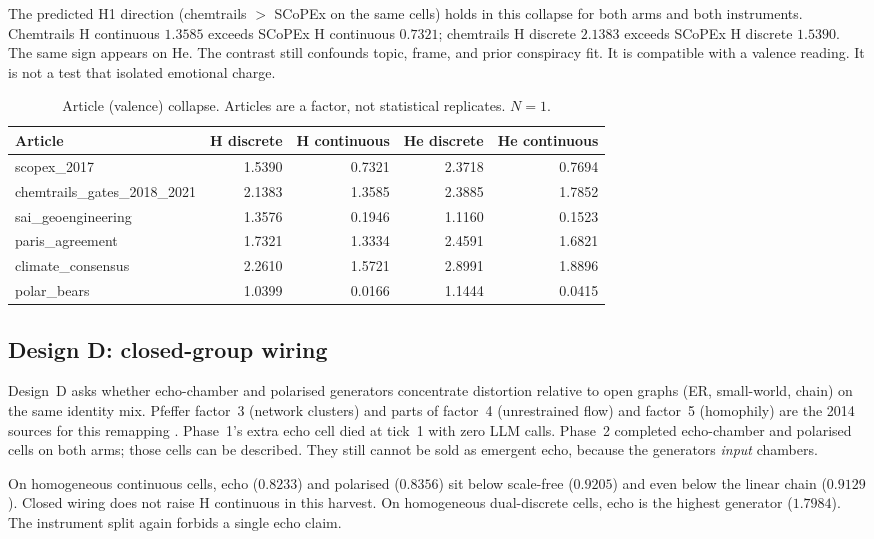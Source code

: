 The predicted H1 direction (chemtrails $>$ SCoPEx on the same cells) holds in this collapse for both arms and both instruments.
Chemtrails H continuous $1.3585$ exceeds SCoPEx H continuous $0.7321$; chemtrails H discrete $2.1383$ exceeds SCoPEx H discrete $1.5390$.
The same sign appears on He.
The contrast still confounds topic, frame, and prior conspiracy fit.
It is compatible with a valence reading.
It is not a test that isolated emotional charge.

\begin{table}[t]
\centering
\caption{Article (valence) collapse.
Articles are a factor, not statistical replicates.
$N=1$.}
\label{tab:articles}
\begin{tabular}{lrrrr}
\toprule
Article & H discrete & H continuous & He discrete & He continuous \\
\midrule
scopex\_2017 & 1.5390 & 0.7321 & 2.3718 & 0.7694 \\
chemtrails\_gates\_2018\_2021 & 2.1383 & 1.3585 & 2.3885 & 1.7852 \\
sai\_geoengineering & 1.3576 & 0.1946 & 1.1160 & 0.1523 \\
paris\_agreement & 1.7321 & 1.3334 & 2.4591 & 1.6821 \\
climate\_consensus & 2.2610 & 1.5721 & 2.8991 & 1.8896 \\
polar\_bears & 1.0399 & 0.0166 & 1.1444 & 0.0415 \\
\bottomrule
\end{tabular}
\end{table}

\subsection{Design D: closed-group wiring}

Design~D asks whether echo-chamber and polarised generators concentrate distortion relative to open graphs (ER, small-world, chain) on the same identity mix.
Pfeffer factor~3 (network clusters) and parts of factor~4 (unrestrained flow) and factor~5 (homophily) are the 2014 sources for this remapping \parencite{pfeffer2014firestorms}.
Phase~1's extra echo cell died at tick~1 with zero LLM calls.
Phase~2 completed echo-chamber and polarised cells on both arms; those cells can be described.
They still cannot be sold as emergent echo, because the generators \emph{input} chambers.

On homogeneous continuous cells, echo ($0.8233$) and polarised ($0.8356$) sit below scale-free ($0.9205$) and even below the linear chain ($0.9129$).
Closed wiring does not raise H continuous \MPR{} in this harvest.
On homogeneous dual-discrete cells, echo is the highest generator ($1.7984$).
The instrument split again forbids a single echo claim.


